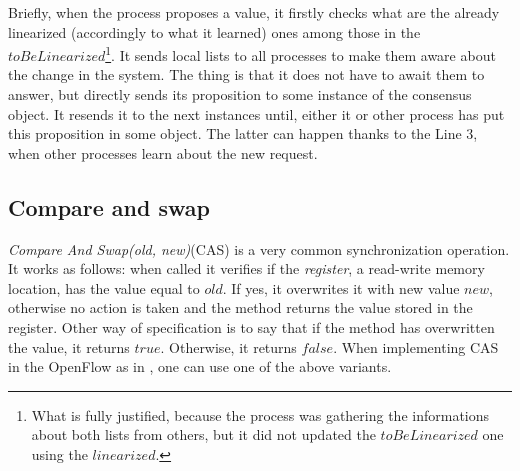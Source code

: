 \documentclass{article}
\theoremstyle{remark}
\begin{document}
Briefly, when the process proposes a value, it firstly checks what are the already linearized (accordingly to what it learned) ones among those in the $toBeLinearized$\footnote{What is fully justified, because the process was gathering the informations about both lists from others, but it did not updated the $toBeLinearized$ one using the $linearized$.}. It sends local lists to all processes to make them aware about the change in the system. The thing is that it does not have to await them to answer, but directly sends its proposition to some instance of the consensus object. It resends it to the next instances until, either it or other process has put this proposition in some object. The latter can happen thanks to the Line 3, when other processes learn about the new request.
\subsection{Compare and swap}
\emph{Compare And Swap(old, new)}(CAS) is a very common synchronization operation. It works as follows: when called it verifies if the \emph{register}, a read-write memory location, has the value equal to $old$. If yes, it overwrites it with new value $new$, otherwise no action is taken and the method returns the value stored in the register. Other way of specification is to say that if the method has overwritten the value, it returns $true$. Otherwise, it returns $false$.
When implementing CAS in the OpenFlow as in \cite{In-band}, one can use one of the above variants. 

%
%
\end{document}
